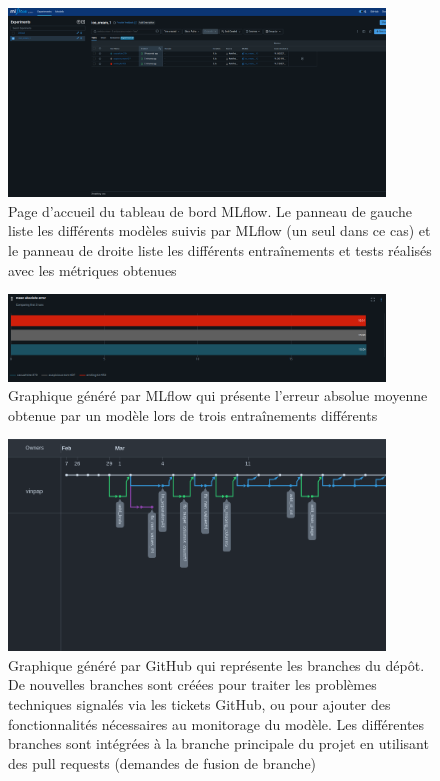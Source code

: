 \documentclass[french]{article}
\begin{document}
    \begin{figure}[h!]
        \includegraphics[width=10cm]{ml_flow_home}
        \centering
        \caption{Page d'accueil du tableau de bord MLflow. Le panneau de gauche liste les différents modèles suivis par MLflow (un seul dans ce cas) et le panneau de droite liste les différents entraînements et tests réalisés avec les métriques obtenues}
        \centering
    \end{figure}
    \begin{figure}[h!]
        \includegraphics[width=10cm]{ml_flow_metrics}
        \centering
        \caption{Graphique généré par MLflow qui présente l'erreur absolue moyenne obtenue par un modèle lors de trois entraînements différents}
        \centering
        \label{fig:mlflow}
    \end{figure}
    \begin{figure}[h!]
        \includegraphics[width=10cm]{gh_graph}
        \centering
        \caption{Graphique généré par GitHub qui représente les branches du dépôt. De nouvelles branches sont créées pour traiter les problèmes techniques signalés via les tickets GitHub, ou pour ajouter des fonctionnalités nécessaires au monitorage du modèle. Les différentes branches sont intégrées à la branche principale du projet en utilisant des pull requests (demandes de fusion de branche)}
        \centering
    \end{figure}
\end{document}
